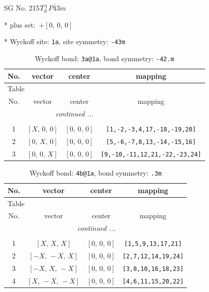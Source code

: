 \documentclass[fleqn,8pt]{jsarticle}
\begin{document}
\setcounter{MaxMatrixCols}{32}

\renewcommand{\tablename}{Table~}
\renewcommand{\figurename}{Figure~}
\begin{center}
\LARGE
SG No. 215\quad$T_{\rm d}^{1}$\quad$P\bar{4}3m$\quad[ cubic ]
\end{center}

* plus set:\,\,\,$+\left[ 0,\, 0,\, 0 \right]$


* Wyckoff site: {\tt 1a}, site symmetry: {\tt -43m}
\renewcommand{\arraystretch}{1.2}
\begin{longtable}{cccc}
\caption{Wyckoff bond: {\tt 3a@1a}, bond symmetry: {\tt -42.m}}
 \\
 \hline \hline
No. & vector & center & mapping \\ \hline \endfirsthead

\multicolumn{3}{l}{\tablename\ \thetable{}} \\
 \hline \hline
No. & vector & center & mapping \\ \hline \endhead

 \hline \hline
\multicolumn{3}{r}{\footnotesize\it continued ...} \\ \endfoot

 \hline \hline
\multicolumn{3}{r}{} \\ \endlastfoot

1 & $\left[ X,\, 0,\, 0 \right]$ & $\left[ 0,\, 0,\, 0 \right]$ & {\tt [1,-2,-3,4,17,-18,-19,20]} \\ \hline
2 & $\left[ 0,\, X,\, 0 \right]$ & $\left[ 0,\, 0,\, 0 \right]$ & {\tt [5,-6,-7,8,13,-14,-15,16]} \\ \hline
3 & $\left[ 0,\, 0,\, X \right]$ & $\left[ 0,\, 0,\, 0 \right]$ & {\tt [9,-10,-11,12,21,-22,-23,24]} \\
\end{longtable}
\renewcommand{\arraystretch}{1.2}
\begin{longtable}{cccc}
\caption{Wyckoff bond: {\tt 4b@1a}, bond symmetry: {\tt .3m}}
 \\
 \hline \hline
No. & vector & center & mapping \\ \hline \endfirsthead

\multicolumn{3}{l}{\tablename\ \thetable{}} \\
 \hline \hline
No. & vector & center & mapping \\ \hline \endhead

 \hline \hline
\multicolumn{3}{r}{\footnotesize\it continued ...} \\ \endfoot

 \hline \hline
\multicolumn{3}{r}{} \\ \endlastfoot

1 & $\left[ X,\, X,\, X \right]$ & $\left[ 0,\, 0,\, 0 \right]$ & {\tt [1,5,9,13,17,21]} \\ \hline
2 & $\left[ - X,\, - X,\, X \right]$ & $\left[ 0,\, 0,\, 0 \right]$ & {\tt [2,7,12,14,19,24]} \\ \hline
3 & $\left[ - X,\, X,\, - X \right]$ & $\left[ 0,\, 0,\, 0 \right]$ & {\tt [3,8,10,16,18,23]} \\ \hline
4 & $\left[ X,\, - X,\, - X \right]$ & $\left[ 0,\, 0,\, 0 \right]$ & {\tt [4,6,11,15,20,22]} \\
\end{longtable}
\end{document}
